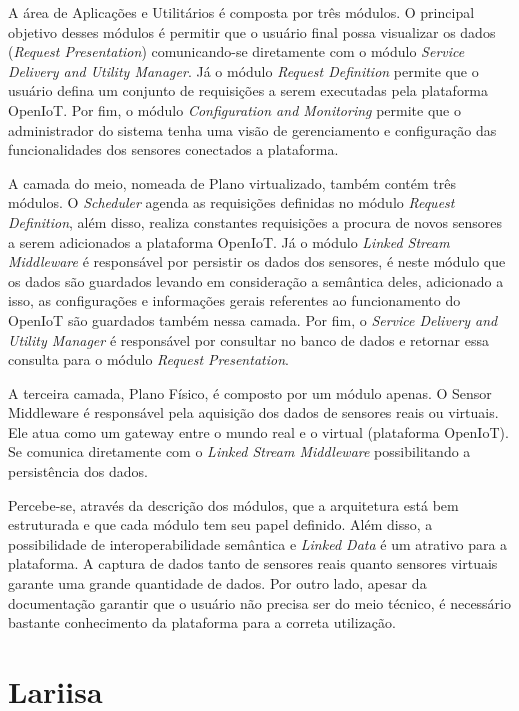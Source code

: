     
A área de Aplicações e Utilitários é composta por três módulos. O principal
objetivo desses módulos é permitir que o usuário final possa visualizar os
dados (\textit{Request Presentation}) comunicando-se diretamente com o módulo
\textit{Service Delivery and Utility Manager}.  Já o módulo \textit{Request
Definition} permite que o usuário defina um conjunto de requisições a serem
executadas pela plataforma OpenIoT. Por fim, o módulo \textit{Configuration and
Monitoring} permite que o administrador do sistema tenha uma visão de
gerenciamento e configuração das funcionalidades dos sensores conectados a
plataforma. 

A camada do meio, nomeada de Plano virtualizado, também contém três módulos. O
\textit{Scheduler} agenda as requisições definidas no módulo \textit{Request
Definition}, além disso, realiza constantes requisições a procura de novos
sensores a serem adicionados a plataforma OpenIoT. Já o módulo \textit{Linked
Stream Middleware} é responsável por persistir os dados dos sensores, é neste
módulo que os dados são guardados levando em consideração a semântica deles,
adicionado a isso, as configurações e informações gerais referentes ao
funcionamento do OpenIoT são guardados também nessa camada. Por fim, o
\textit{Service Delivery and Utility Manager} é responsável por consultar no
banco de dados e retornar essa consulta para o módulo \textit{Request
Presentation}.

A terceira camada, Plano Físico, é composto por um módulo apenas. O Sensor
Middleware é responsável pela aquisição dos dados de sensores reais ou
virtuais. Ele atua como um gateway entre o mundo real e o virtual (plataforma
OpenIoT). Se comunica diretamente com o \textit{Linked Stream Middleware}
possibilitando a persistência dos dados.

Percebe-se, através da descrição dos módulos, que a arquitetura está bem
estruturada e que cada módulo tem seu papel definido. Além disso, a
possibilidade de interoperabilidade semântica e \textit{Linked Data} é um
atrativo para a plataforma. A captura de dados tanto de sensores reais quanto
sensores virtuais garante uma grande quantidade de dados. Por outro lado,
apesar da documentação garantir que o usuário não precisa ser do meio técnico,
é necessário bastante conhecimento da plataforma para a correta utilização. 

\section{Lariisa}\label{sec:lariisa}

